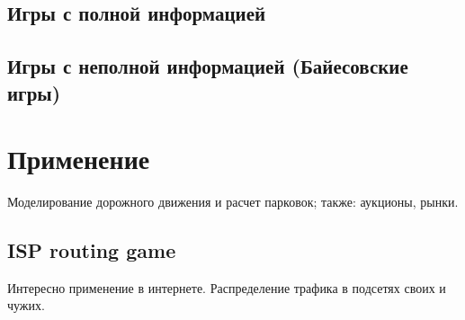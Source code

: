 \documentclass[a4paper,12pt]{article}
\begin{document}
\subsection{Игры с полной информацией}

\subsection{Игры с неполной информацией (Байесовские игры)}


\section{Применение}

Моделирование дорожного движения и расчет парковок; также: аукционы, рынки.

\subsection{ISP routing game}
Интересно применение в интернете. Распределение трафика в подсетях своих и чужих.



\printbibliography
\end{document}

